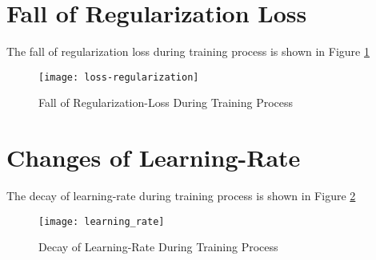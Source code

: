     \section{Fall of Regularization Loss}
        The fall of regularization loss during training process is shown in Figure \ref{fig:loss_reg}
        
        \begin{figure}[h]
            \centering
            \texttt{[image: loss-regularization]}
            \caption{Fall of Regularization-Loss During Training Process}
            \label{fig:loss_reg}
        \end{figure}
        
    \section{Changes of Learning-Rate}
        The decay of learning-rate during training process is shown in Figure \ref{fig:learning_rate}
        
        \begin{figure}[h]
            \centering
            \texttt{[image: learning\_rate]}
            \caption{Decay of Learning-Rate During Training Process}
            \label{fig:learning_rate}
        \end{figure}
        

